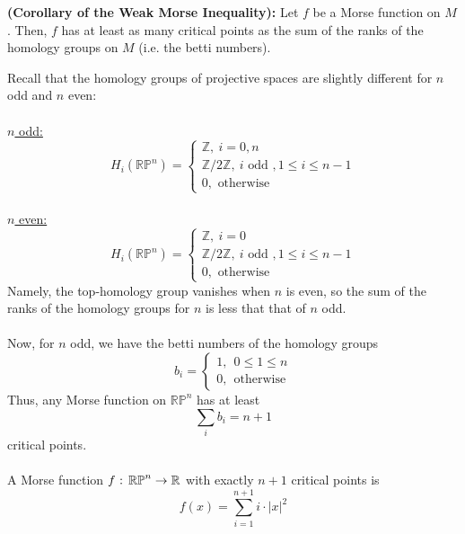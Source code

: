 \documentclass[11pt]{article}
\begin{document}
\begin{redbox}
  \begin{theorem} \textbf{(Corollary of the Weak Morse Inequality):} Let $f$ be a Morse function on $M$. Then, $f$ has at least as many critical points as the sum of the ranks of the homology groups on $M$ (i.e. the betti numbers).
  \end{theorem}
\end{redbox} 

\vskip 0.5cm
Recall that the homology groups of projective spaces are slightly different for $n$ odd and $n$ even:
\\
\\
\underline{$n$ odd:}
$$ H_i \left( \mathbb{RP}^n \right) = \begin{cases}
  \mathbb{Z},~i = 0, n\\
  \mathbb{Z}/2\mathbb{Z},~i \text{ odd }, 1 \leq i \leq n-1 \\
  0, \text{ otherwise }
\end{cases} $$ 
\\
\underline{$n$ even:}
$$ H_i \left( \mathbb{RP}^n \right) = \begin{cases}
  \mathbb{Z},~i = 0 \\
  \mathbb{Z}/2\mathbb{Z},~i \text{ odd }, 1 \leq i \leq n-1 \\
  0, \text{ otherwise }
\end{cases} $$
Namely, the top-homology group vanishes when $n$ is even, so the sum of the ranks of the homology groups for $n$ is less that that of $n$ odd.
\\
\\
Now, for $n$ odd, we have the betti numbers of the homology groups $$ b_i = \begin{cases}
  1,~~0 \leq 1 \leq n \\
  0,~~\text{otherwise}
\end{cases} $$
Thus, any Morse function on $\mathbb{RP}^n$ has at least $$ \sum_{i} b_i = n+1 $$ critical points.
\\
\\
A Morse function $f \text{ : } \mathbb{RP}^n \rightarrow \mathbb{R}$ with exactly $n+1$ critical points is $$ f(x) = \sum_{i=1}^{n+1} i\cdot|x|^2 $$
\end{document}
